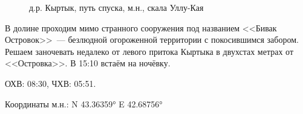 \begin{figure}[h!]
	\centering
	\caption{д.р. Кыртык, путь спуска, м.н., скала Уллу-Кая}
	\label{fig:kyrtyk3}
\end{figure}

В долине проходим мимо странного сооружения под названием <<Бивак Островок>>~--- безлюдной огороженной территории с покосившимся забором. Решаем заночевать недалеко от левого притока Кыртыка в двухстах метрах от <<Островка>>. В 15:10 встаём на ночёвку. 


ОХВ: 08:30, ЧХВ: 05:51.

Координаты м.н.: N 43.36359° E 42.68756°


\clearpage
